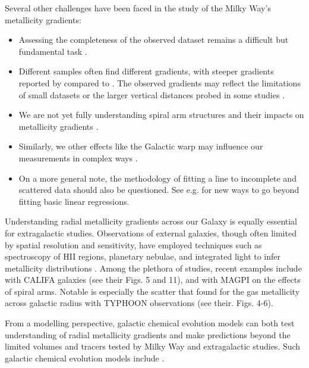 \documentclass[fleqn,usenatbib]{mnras}
\begin{document}
Several other challenges have been faced in the study of the Milky Way's metallicity gradients:
\begin{itemize}
    \item Assessing the completeness of the observed dataset remains a difficult but fundamental task \citep{Bergemann2014}.
    \item Different samples often find different gradients, with steeper gradients reported by \citet{Bergemann2014, Boeche2013} compared to \citet{AllendePrieto2006, Hayden2014, Anders2014, Katz2011}. The observed gradients may reflect the limitations of small datasets or the larger vertical distances probed in some studies \citep{Bergemann2014}.
    \item We are not yet fully understanding spiral arm structures and their impacts on metallicity gradients \citep{Poggio2021, Poggio2022}.
    \item Similarly, we other effects like the Galactic warp may influence our measurements in complex ways \citep[e.g.][]{Lemasle2022}.
    \item On a more general note, the methodology of fitting a line to incomplete and scattered data should also be questioned. See e.g. \citet{Metha2021} for new ways to go beyond fitting basic linear regressions.
\end{itemize}

Understanding radial metallicity gradients across our Galaxy is equally essential for extragalactic studies. Observations of external galaxies, though often limited by spatial resolution and sensitivity, have employed techniques such as spectroscopy of HII regions, planetary nebulae, and integrated light to infer metallicity distributions \citep{Shaver1983, Vilchez1996, Rolleston2000, Bresolin2012, Sanchez2014}. Among the plethora of studies, recent examples include \citet{Sanchez2014} with CALIFA galaxies (see their Figs. 5 and 11), \citet{Mun2024} and \citet{Chen2024} with MAGPI on the effects of spiral arms. Notable is especially the scatter that \citet{Chen2023} found for the gas metallicity across galactic radius with TYPHOON observations (see their. Figs. 4-6).

From a modelling perspective, galactic chemical evolution models can both test understanding of radial metallicity gradients and make predictions beyond the limited volumes and tracers tested by Milky Way and extragalactic studies. Such galactic chemical evolution models include \citet{Chiappini2001, Minchev2014b, Kubryk2015, Stanghellini2015, Matteucci2001b}.
\end{document}
